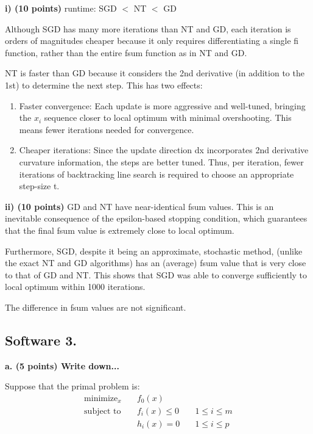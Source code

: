 \documentclass[a4paper,10pt]{article}
\theoremstyle{definition}
\begin{document}
\textbf{i) (10 points)}
runtime: SGD $<$ NT $<$ GD

Although SGD has many more iterations than NT and GD, each iteration is
orders of magnitudes cheaper because it only requires differentiating a single fi function,
rather than the entire fsum function as in NT and GD.

NT is faster than GD because it considers the 2nd derivative (in addition to the 1st) to
determine the next step. This has two effects:
\begin{enumerate}
    \item Faster convergence: Each update is more aggressive and well-tuned, 
        bringing the $x_i$ sequence closer to local optimum with minimal overshooting. 
        This means fewer iterations needed for convergence.
    \item Cheaper iterations: Since the update direction dx incorporates 2nd derivative curvature
information, the steps are better tuned. Thus, per iteration, fewer iterations of backtracking
line search is required to choose an appropriate step-size t.
\end{enumerate}

\textbf{ii) (10 points)}
GD and NT have near-identical fsum values.
This is an inevitable consequence of the epsilon-based stopping condition,
which guarantees that the final fsum value is extremely close to local optimum.

Furthermore, SGD, despite it being an approximate, stochastic method, (unlike
the exact NT and GD algorithms) has an (average) fsum value that is very
close to that of GD and NT. This shows that SGD was able to converge sufficiently
to local optimum within 1000 iterations.

The difference in fsum values are not significant.


\subsection*{Software 3. }

\textbf{a. (5 points) Write down...}

Suppose that the primal problem is:
\[
\begin{aligned}
    \text{minimize}_{x} \quad & f_0(x) \\
    \text{subject to} \quad & f_i(x) \leq 0 \quad & 1 \leq i \leq m\\
                            & h_i(x) = 0    \quad & 1 \leq i \leq p 
\end{aligned}
\]
\end{document}
